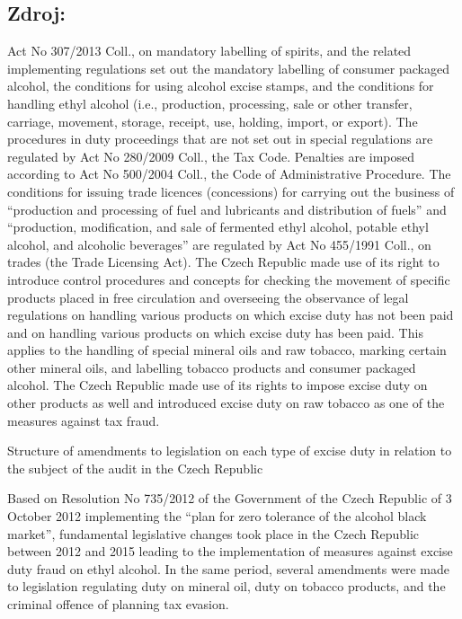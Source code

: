 \documentclass[10pt]{article}
\begin{document}
\subsection*{Zdroj:}

Act No 307/2013 Coll., on mandatory labelling of spirits, and the related implementing regulations set out the mandatory labelling of consumer packaged alcohol, the conditions for using alcohol excise stamps, and the conditions for handling ethyl alcohol (i.e., production, processing, sale or other transfer, carriage, movement, storage, receipt, use, holding, import, or export).
The procedures in duty proceedings that are not set out in special regulations are regulated by Act No 280/2009 Coll., the Tax Code.
Penalties are imposed according to Act No 500/2004 Coll., the Code of Administrative Procedure.
The conditions for issuing trade licences (concessions) for carrying out the business of “production and processing of fuel and lubricants and distribution of fuels” and “production, modification, and sale of fermented ethyl alcohol, potable ethyl alcohol, and alcoholic beverages” are regulated by Act No 455/1991 Coll., on trades (the Trade Licensing Act).
The Czech Republic made use of its right to introduce control procedures and concepts for checking the movement of specific products placed in free circulation and overseeing the observance of legal regulations on handling various products on which excise duty has not been paid and on handling various products on which excise duty has been paid.
This applies to the handling of special mineral oils and raw tobacco, marking certain other mineral oils, and labelling tobacco products and consumer packaged alcohol.
The Czech Republic made use of its rights to impose excise duty on other products as well and introduced excise duty on raw tobacco as one of the measures against tax fraud.


Structure of amendments to legislation on each type of excise duty in relation to the subject of the audit in the Czech Republic

Based on Resolution No 735/2012 of the Government of the Czech Republic of 3 October 2012 implementing the “plan for zero tolerance of the alcohol black market”, fundamental legislative changes took place in the Czech Republic between 2012 and 2015 leading to the implementation of measures against excise duty fraud on ethyl alcohol.
In the same period, several amendments were made to legislation regulating duty on mineral oil, duty on tobacco products, and the criminal offence of planning tax evasion.
\end{document}

